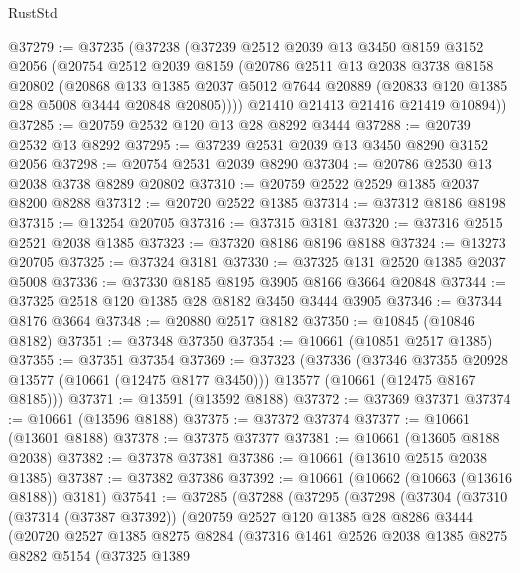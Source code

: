 \begin{lexlean}{RustStd}
\begin{coremodule}
@37279 := @37235
    (@37238
      (@37239
        @2512
        @2039
        @13
        @3450
        @8159
        @3152
        @2056
        (@20754
          @2512
          @2039
          @8159
          (@20786
            @2511
            @13
            @2038
            @3738
            @8158
            @20802
            (@20868
              @133
              @1385
              @2037
              @5012
              @7644
              @20889
              (@20833 @120 @1385 @28 @5008 @3444 @20848 @20805))))
        @21410
        @21413
        @21416
        @21419
        @10894))
@37285 := @20759 @2532 @120 @13 @28 @8292 @3444
@37288 := @20739 @2532 @13 @8292
@37295 := @37239 @2531 @2039 @13 @3450 @8290 @3152 @2056
@37298 := @20754 @2531 @2039 @8290
@37304 := @20786 @2530 @13 @2038 @3738 @8289 @20802
@37310 := @20759 @2522 @2529 @1385 @2037 @8200 @8288
@37312 := @20720 @2522 @1385
@37314 := @37312 @8186 @8198
@37315 := @13254 @20705
@37316 := @37315 @3181
@37320 := @37316 @2515 @2521 @2038 @1385
@37323 := @37320 @8186 @8196 @8188
@37324 := @13273 @20705
@37325 := @37324 @3181
@37330 := @37325 @131 @2520 @1385 @2037 @5008
@37336 := @37330 @8185 @8195 @3905 @8166 @3664 @20848
@37344 := @37325 @2518 @120 @1385 @28 @8182 @3450 @3444 @3905
@37346 := @37344 @8176 @3664
@37348 := @20880 @2517 @8182
@37350 := @10845 (@10846 @8182)
@37351 := @37348 @37350
@37354 := @10661 (@10851 @2517 @1385)
@37355 := @37351 @37354
@37369 := @37323
    (@37336
      (@37346 @37355 @20928 @13577 (@10661 (@12475 @8177 @3450)))
      @13577
      (@10661 (@12475 @8167 @8185)))
@37371 := @13591 (@13592 @8188)
@37372 := @37369 @37371
@37374 := @10661 (@13596 @8188)
@37375 := @37372 @37374
@37377 := @10661 (@13601 @8188)
@37378 := @37375 @37377
@37381 := @10661 (@13605 @8188 @2038)
@37382 := @37378 @37381
@37386 := @10661 (@13610 @2515 @2038 @1385)
@37387 := @37382 @37386
@37392 := @10661 (@10662 (@10663 (@13616 @8188)) @3181)
@37541 := @37285
    (@37288
      (@37295
        (@37298
          (@37304
            (@37310
              (@37314 (@37387 @37392))
              (@20759
                @2527
                @120
                @1385
                @28
                @8286
                @3444
                (@20720
                  @2527
                  @1385
                  @8275
                  @8284
                  (@37316
                    @1461
                    @2526
                    @2038
                    @1385
                    @8275
                    @8282
                    @5154
                    (@37325
                      @1389

\end{coremodule}
\end{lexlean}

